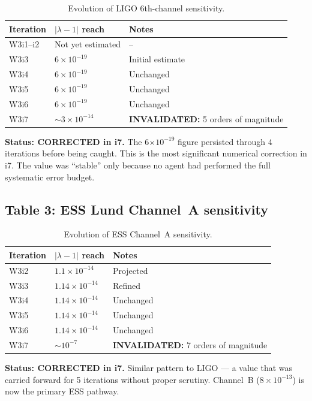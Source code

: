 \documentclass[11pt]{article}
\newcommand{\ee}[1]{\times 10^{#1}}
\newcommand{\lbone}{|\lambda - 1|}
\begin{document}
\begin{table}[H]
\centering
\caption{Evolution of LIGO 6th-channel sensitivity.}
\label{tab:ligo-reach}
\begin{tabular}{lll}
\toprule
\textbf{Iteration} & $\lbone$ \textbf{reach} & \textbf{Notes} \\
\midrule
W3i1--i2 & Not yet estimated & -- \\
W3i3 & $6\ee{-19}$ & Initial estimate \\
W3i4 & $6\ee{-19}$ & Unchanged \\
W3i5 & $6\ee{-19}$ & Unchanged \\
W3i6 & $6\ee{-19}$ & Unchanged \\
W3i7 & $\sim 3\ee{-14}$ & \textbf{INVALIDATED:} 5 orders of magnitude \\
\bottomrule
\end{tabular}
\end{table}

\textbf{Status: \textcolor{volatile}{CORRECTED in i7.}} The 6$\times 10^{-19}$
figure persisted through 4 iterations before being caught. This is the most
significant numerical correction in i7. The value was ``stable'' only because
no agent had performed the full systematic error budget.

\subsection{Table 3: ESS Lund Channel~A sensitivity}

\begin{table}[H]
\centering
\caption{Evolution of ESS Channel~A sensitivity.}
\label{tab:ESS-A}
\begin{tabular}{lll}
\toprule
\textbf{Iteration} & $\lbone$ \textbf{reach} & \textbf{Notes} \\
\midrule
W3i2 & $1.1\ee{-14}$ & Projected \\
W3i3 & $1.14\ee{-14}$ & Refined \\
W3i4 & $1.14\ee{-14}$ & Unchanged \\
W3i5 & $1.14\ee{-14}$ & Unchanged \\
W3i6 & $1.14\ee{-14}$ & Unchanged \\
W3i7 & $\sim 10^{-7}$ & \textbf{INVALIDATED:} 7 orders of magnitude \\
\bottomrule
\end{tabular}
\end{table}

\textbf{Status: \textcolor{volatile}{CORRECTED in i7.}} Similar pattern
to LIGO --- a value that was carried forward for 5 iterations without
proper scrutiny. Channel~B ($8\ee{-13}$) is now the primary ESS pathway.
\end{document}
